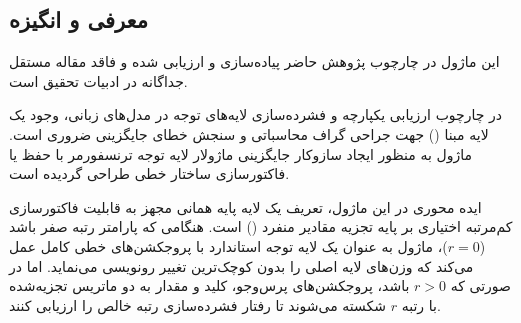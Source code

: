 \subsection{معرفی و انگیزه}
این ماژول در چارچوب پژوهش حاضر پیاده‌سازی و ارزیابی شده و فاقد مقاله مستقل جداگانه در ادبیات تحقیق است.

در چارچوب ارزیابی یکپارچه و فشرده‌سازی لایه‌های توجه در مدل‌های زبانی، وجود یک لایه مبنا () جهت جراحی گراف محاسباتی و سنجش خطای جایگزینی ضروری است. ماژول  به منظور ایجاد سازوکار جایگزینی ماژولار لایه توجه ترنسفورمر با حفظ یا فاکتورسازی ساختار خطی طراحی گردیده است.

ایده محوری در این ماژول، تعریف یک لایه پایه همانی مجهز به قابلیت فاکتورسازی کم‌مرتبه اختیاری بر پایه تجزیه مقادیر منفرد () است. هنگامی که پارامتر رتبه صفر باشد ($r=0$)، ماژول به عنوان یک لایه توجه استاندارد با پروجکشن‌های خطی کامل عمل می‌کند که وزن‌های لایه اصلی را بدون کوچک‌ترین تغییر رونویسی می‌نماید. اما در صورتی که $r > 0$ باشد، پروجکشن‌های پرس‌وجو، کلید و مقدار به دو ماتریس تجزیه‌شده با رتبه $r$ شکسته می‌شوند تا رفتار فشرده‌سازی رتبه خالص را ارزیابی کنند.
